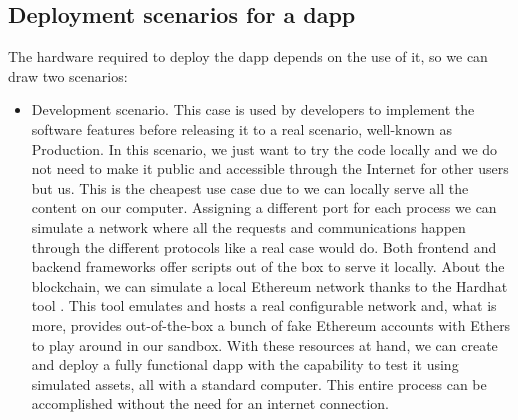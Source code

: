 \documentclass[a4paper,12pt]{article}
\begin{document}
\begin{appendices}

\section{Deployment scenarios for a dapp}
\label{appendix:deployment-dapp}
{
{The hardware required to deploy the dapp depends on the use of it, so we can draw two scenarios:}
\begin{itemize}
    \item Development scenario. This case is used by developers to implement the software features before releasing it to a real scenario, well-known as Production. In this scenario, we just want to try the code locally and we do not need to make it public and accessible through the Internet for other users but us. This is the cheapest use case due to we can locally serve all the content on our computer. Assigning a different port for each process we can simulate a network where all the requests and communications happen through the different protocols like a real case would do. Both frontend and backend frameworks offer scripts out of the box to serve it locally. About the blockchain, we can simulate a local Ethereum network thanks to the Hardhat tool \cite{hardhat_network}. This tool emulates and hosts a real configurable network and, what is more, provides out-of-the-box a bunch of fake Ethereum accounts with Ethers to play around in our sandbox. With these resources at hand, we can create and deploy a fully functional dapp with the capability to test it using simulated assets, all with a standard computer. This entire process can be accomplished without the need for an internet connection. 
    

\end{itemize}}
\end{appendices}
\end{document}

